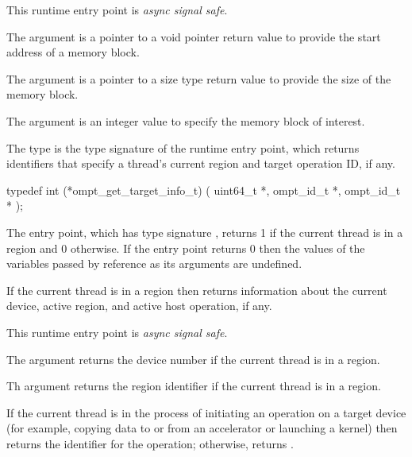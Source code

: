 This runtime entry point is \emph{async signal safe}.

\argdesc
The  argument is a pointer to a void pointer return value
to provide the start address of a memory block.  

The  argument is a pointer to a size type return
value to provide the size of the memory block.

The  argument is an integer value to specify the
memory block of interest.



\label{sec:ompt_get_target_info_t}
\label{sec:ompt_get_target_info}

\summary
The  type is the type signature of the 
 runtime entry point, which returns identifiers 
that specify a thread's current  region and target operation ID, if any.

\format
\begin{ccppspecific}
\begin{omptInquiry}
typedef int (*ompt_get_target_info_t) (
  uint64_t *,
  ompt_id_t *,
  ompt_id_t *
);
\end{omptInquiry}
\end{ccppspecific}

\descr
The  entry point, which has type signature 
, returns 1 if the current thread is in a 
 region and 0 otherwise. If the entry point returns 0 then
the values of the variables passed by reference as its arguments are undefined.

If the current thread is in a  region then 
returns information about the current device, active  region, and
active host operation, if any.

This runtime entry point is \emph{async signal safe}.

\argdesc
The  argument returns the device number if the current 
thread is in a  region.

Th  argument returns the  region identifier 
if the current thread is in a  region.

If the current thread is in the process of initiating an operation on a 
target device (for example, copying data to or from an accelerator or 
launching a kernel) then  returns the identifier for the 
operation; otherwise,  returns .

